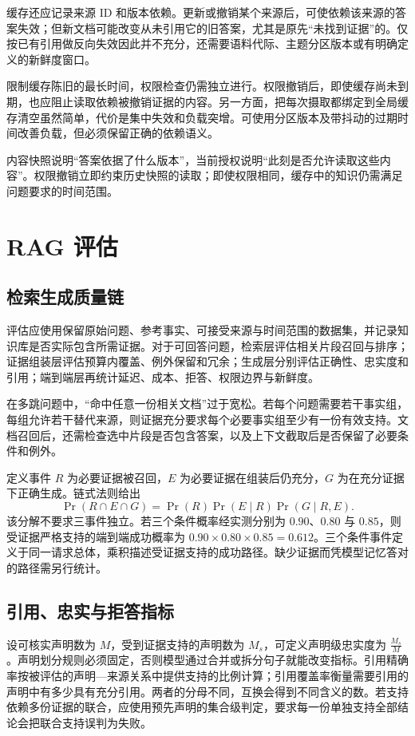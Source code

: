\documentclass[../textbook.tex]{subfiles}
\begin{document}
缓存还应记录来源 ID 和版本依赖。更新或撤销某个来源后，可使依赖该来源的答案失效；但新文档可能改变从未引用它的旧答案，尤其是原先“未找到证据”的。仅按已有引用做反向失效因此并不充分，还需要语料代际、主题分区版本或有明确定义的新鲜度窗口。

限制缓存陈旧的最长时间，权限检查仍需独立进行。权限撤销后，即使缓存尚未到期，也应阻止读取依赖被撤销证据的内容。另一方面，把每次摄取都绑定到全局缓存清空虽然简单，代价是集中失效和负载突增。可使用分区版本及带抖动的过期时间改善负载，但必须保留正确的依赖语义。

\begin{caution}[证据版本与当前授权]
内容快照说明“答案依据了什么版本”，当前授权说明“此刻是否允许读取这些内容”。权限撤销立即约束历史快照的读取；即使权限相同，缓存中的知识仍需满足问题要求的时间范围。
\end{caution}

\section{RAG 评估}

\subsection{检索生成质量链}
评估应使用保留原始问题、参考事实、可接受来源与时间范围的数据集，并记录知识库是否实际包含所需证据。对于可回答问题，检索层评估相关片段召回与排序；证据组装层评估预算内覆盖、例外保留和冗余；生成层分别评估正确性、忠实度和引用；端到端层再统计延迟、成本、拒答、权限边界与新鲜度。

在多跳问题中，“命中任意一份相关文档”过于宽松。若每个问题需要若干事实组，每组允许若干替代来源，则证据充分要求每个必要事实组至少有一份有效支持。文档召回后，还需检查选中片段是否包含答案，以及上下文截取后是否保留了必要条件和例外。

定义事件 $R$ 为必要证据被召回，$E$ 为必要证据在组装后仍充分，$G$ 为在充分证据下正确生成。链式法则给出
\begin{equation}
 \Pr(R\cap E\cap G)=\Pr(R)\Pr(E\mid R)\Pr(G\mid R,E).
\end{equation}
该分解不要求三事件独立。若三个条件概率经实测分别为 $0.90$、$0.80$ 与 $0.85$，则受证据严格支持的端到端成功概率为 $0.90\times0.80\times0.85=0.612$。三个条件事件定义于同一请求总体，乘积描述受证据支持的成功路径。缺少证据而凭模型记忆答对的路径需另行统计。

\subsection{引用、忠实与拒答指标}
设可核实声明数为 $M$，受到证据支持的声明数为 $M_s$，可定义声明级忠实度为 $\frac{M_s}{M}$。声明划分规则必须固定，否则模型通过合并或拆分句子就能改变指标。引用精确率按被评估的声明—来源关系中提供支持的比例计算；引用覆盖率衡量需要引用的声明中有多少具有充分引用。两者的分母不同，互换会得到不同含义的数。若支持依赖多份证据的联合，应使用预先声明的集合级判定，要求每一份单独支持全部结论会把联合支持误判为失败。
\end{document}
